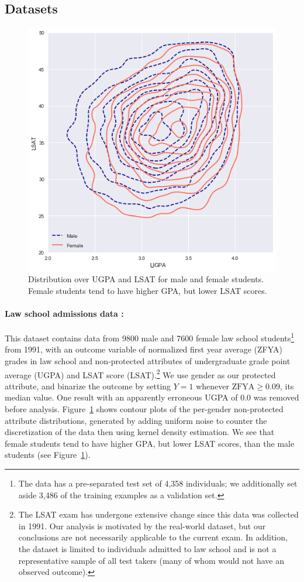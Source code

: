     \subsection{Datasets} \label{monofair_datasets}
        \begin{figure}[ht]
            \centering
            \includegraphics[width=.5\textwidth]{fig_monofair/law_school_contour}
            \caption{Distribution over UGPA and LSAT for male and female students. Female students tend to have higher GPA, but lower LSAT scores.}
            \label{fig:law_contour}
        \end{figure}
        
        \paragraph{Law school admissions data \citep{wightman1998lsac}:} 
            This dataset  contains data from 9800 male and 7600 female law school students\footnote{The data has a pre-separated test set of 4,358 individuals; we additionally set aside 3,486 of the training examples as a validation set.} from 1991, with an outcome variable of normalized first year average (ZFYA) grades in law school and non-protected attributes of undergraduate grade point average (UGPA) and LSAT score (LSAT).\footnote{The LSAT exam has undergone extensive change since this data was collected in 1991.  Our analysis is motivated by the real-world dataset, but our conclusions are not necessarily applicable to the current exam. In addition, the dataset is limited to individuals admitted to law school and is not a representative sample of all test takers (many of whom would not have an observed outcome).}  We use gender as our protected attribute, and binarize the outcome by setting $Y=1$ whenever $\mbox{ZFYA} \ge 0.09$, its median value. One result with an apparently erroneous UGPA of 0.0 was removed before analysis. Figure~\ref{fig:law_contour} shows contour plots of the per-gender non-protected attribute distributions, generated by adding uniform noise to counter the discretization of the data then using kernel density estimation. We see that female students tend to have higher GPA, but lower LSAT scores, than the male students (see Figure~\ref{fig:law_contour}).
        
